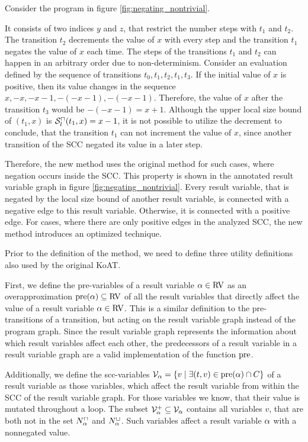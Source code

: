 Consider the program in figure \ref{fig:negating_nontrivial}.



It consists of two indices $y$ and $z$, that restrict the number steps with $t_1$ and $t_2$.
The transition $t_2$ decrements the value of $x$ with every step and the transition $t_1$ negates the value of $x$ each time.
The steps of the transitions $t_1$ and $t_2$ can happen in an arbitrary order due to non-determinism.
Consider an evaluation defined by the sequence of transitions $t_0, t_1, t_2, t_1, t_3$.
If the initial value of $x$ is positive, then its value changes in the sequence $x, -x, -x-1, -(-x-1), -(-x-1)$.
Therefore, the value of $x$ after the transition $t_3$ would be $-(-x-1) = x+1$.
Although the upper local size bound of $(t_1,x)$ is ${\mathcal{S}^\sqcap_l}(t_1,x) = x-1$, it is not possible to utilize the decrement to conclude, that the transition $t_1$ can not increment the value of $x$, since another transition of the SCC negated its value in a later step.

Therefore, the new method uses the original method for such cases, where negation occurs inside the SCC.
This property is shown in the annotated result variable graph in figure \ref{fig:negating_nontrivial}.
Every result variable, that is negated by the local size bound of another result variable, is connected with a negative edge to this result variable.
Otherwise, it is connected with a positive edge.
For cases, where there are only positive edges in the analyzed SCC, the new method introduces an optimized technique.

Prior to the definition of the method, we need to define three utility definitions also used by the original KoAT.

First, we define the pre-variables of a result variable $\alpha \in \text{RV}$ as an overapproximation $\text{pre}(\alpha) \subseteq \text{RV}$ of all the result variables that directly affect the value of a result variable $\alpha \in \text{RV}$.
This is a similar definition to the pre-transitions of a transition, but acting on the result variable graph instead of the program graph.
Since the result variable graph represents the information about which result variables affect each other, the predecessors of a result variable in a result variable graph are a valid implementation of the function $\text{pre}$.

Additionally, we define the scc-variables $\mathcal{V}_\alpha = \lbrace  v \mid \exists (t, v) \in \text{pre}(\alpha) \cap C  \rbrace$ of a result variable as those variables, which affect the result variable from within the SCC of the result variable graph.
For those variables we know, that their value is mutated throughout a loop.
The subset $\mathcal{V}^+_\alpha \subseteq \mathcal{V}_\alpha$ contains all variables $v$, that are both not in the set $N^\sqcap_\alpha$ and $N^\sqcup_\alpha$.
Such variables affect a result variable $\alpha$ with a nonnegated value.

